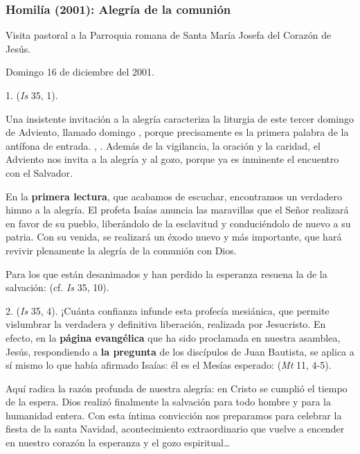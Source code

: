 \begin{body}
\begin{body}
\subsubsection{Homilía (2001): Alegría de la comunión}

Visita pastoral a la Parroquia romana de Santa María Josefa del Corazón de Jesús.

Domingo 16 de diciembre del 2001.

1.  (\emph{Is} 35, 1).

Una insistente invitación a la alegría caracteriza la liturgia de este tercer domingo de Adviento, llamado domingo , porque precisamente  es la primera palabra de la antífona de entrada. , . Además de la vigilancia, la oración y la caridad, el Adviento nos invita a la alegría y al gozo, porque ya es inminente el encuentro con el Salvador.

En la \textbf{primera lectura}, que acabamos de escuchar, encontramos un verdadero himno a la alegría. El profeta Isaías anuncia las maravillas que el Señor realizará en favor de su pueblo, liberándolo de la esclavitud y conduciéndolo de nuevo a su patria. Con su venida, se realizará un éxodo nuevo y más importante, que hará revivir plenamente la alegría de la comunión con Dios.

Para los que están desanimados y han perdido la esperanza resuena la  de la salvación:  (cf. \emph{Is} 35, 10).

2.  (\emph{Is} 35, 4). ¡Cuánta confianza infunde esta profecía mesiánica, que permite vislumbrar la verdadera y definitiva liberación, realizada por Jesucristo. En efecto, en la \textbf{página evangélica} que ha sido proclamada en nuestra asamblea, Jesús, respondiendo a \textbf{la pregunta} de los discípulos de Juan Bautista, se aplica a sí mismo lo que había afirmado Isaías: él es el Mesías esperado:  (\emph{Mt} 11, 4-5).

Aquí radica la razón profunda de nuestra alegría: en Cristo se cumplió el tiempo de la espera. Dios realizó finalmente la salvación para todo hombre y para la humanidad entera. Con esta íntima convicción nos preparamos para celebrar la fiesta de la santa Navidad, acontecimiento extraordinario que vuelve a encender en nuestro corazón la esperanza y el gozo espiritual\ldots{}


\end{body}
\end{body}

